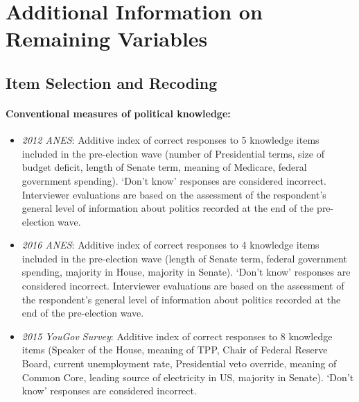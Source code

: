 \clearpage
\section{Additional Information on Remaining Variables}\label{app:variables}

\subsection{Item Selection and Recoding}

\paragraph{Conventional measures of political knowledge:}
\begin{itemize}
\item \textit{2012 ANES}: Additive index of correct responses to 5 knowledge items included in the pre-election wave (number of Presidential terms, size of budget deficit, length of Senate term, meaning of Medicare, federal government spending). `Don't know' responses are considered incorrect. Interviewer evaluations are based on the assessment of the respondent's general level of information about politics recorded at the end of the pre-election wave.
\item \textit{2016 ANES}: Additive index of correct responses to 4 knowledge items included in the pre-election wave (length of Senate term, federal government spending, majority in House, majority in Senate). `Don't know' responses are considered incorrect. Interviewer evaluations are based on the assessment of the respondent's general level of information about politics recorded at the end of the pre-election wave.
\item \textit{2015 YouGov Survey}: Additive index of correct responses to 8 knowledge items (Speaker of the House, meaning of TPP, Chair of Federal Reserve Board, current unemployment rate, Presidential veto override, meaning of Common Core, leading source of electricity in US, majority in Senate). `Don't know' responses are considered incorrect.
\end{itemize}

